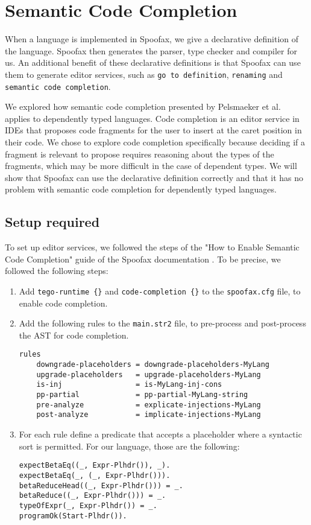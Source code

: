 \chapter{\label{chap:editor-services}Semantic Code Completion}

When a language is implemented in Spoofax, we give a declarative definition of the language. Spoofax then generates the parser, type checker and compiler for us. An additional benefit of these declarative definitions is that Spoofax can use them to generate editor services, such as \verb|go to definition|, \verb|renaming| and \verb|semantic code completion|. 

We explored how semantic code completion presented by Pelsmaeker et al.~\cite{codecompletion} applies to dependently typed languages. Code completion is an editor service in IDEs that proposes code fragments for the user to insert at the caret position in their code. We chose to explore code completion specifically because deciding if a fragment is relevant to propose requires reasoning about the types of the fragments, which may be more difficult in the case of dependent types. We will show that Spoofax can use the declarative definition correctly and that it has no problem with semantic code completion for dependently typed languages.

\section{Setup required}
To set up editor services, we followed the steps of the "How to Enable Semantic Code Completion" guide of the Spoofax documentation \cite{semcomplet}. To be precise, we followed the following steps:
\begin{enumerate}
	\item Add \verb|tego-runtime {}| and \verb|code-completion {}| to the \verb|spoofax.cfg| file, to enable code completion.
	\item Add the following rules to the \verb|main.str2| file, to pre-process and post-process the AST for code completion.
	\begin{lstlisting}
rules
	downgrade-placeholders = downgrade-placeholders-MyLang
	upgrade-placeholders   = upgrade-placeholders-MyLang
	is-inj                 = is-MyLang-inj-cons
	pp-partial             = pp-partial-MyLang-string
	pre-analyze            = explicate-injections-MyLang
	post-analyze           = implicate-injections-MyLang
	\end{lstlisting}
	\item For each rule define a predicate that accepts a placeholder where a syntactic sort is permitted. For our language, those are the following:
	\begin{lstlisting}
expectBetaEq((_, Expr-Plhdr()), _).
expectBetaEq(_, (_, Expr-Plhdr())).
betaReduceHead((_, Expr-Plhdr())) = _.
betaReduce((_, Expr-Plhdr())) = _.
typeOfExpr(_, Expr-Plhdr()) = _.
programOk(Start-Plhdr()).
	\end{lstlisting}
	
\end{enumerate}

